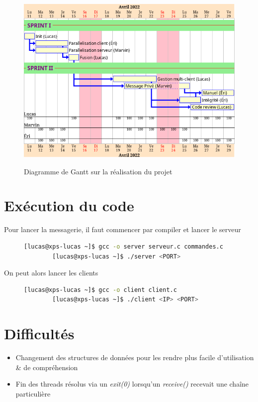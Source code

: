 \documentclass[a4paper,12pt]{article}
\begin{document}
\begin{figure}[h]
	\centering
	\hrulefill\\
	\vspace{0.4cm}
	\includegraphics[width=\linewidth]{gantt.png}\\
	\caption{Diagramme de Gantt sur la réalisation du projet}
	\label{fig:gantt}
	\hrulefill
\end{figure}
\pagebreak
\section{Exécution du code}
Pour lancer la messagerie, il faut commencer par compiler et lancer le serveur
\begin{figure}[h]
	\centering
	\vspace{-0.1cm}
	\begin{lstlisting}[language=bash, gobble=4]
		[lucas@xps-lucas ~]$ gcc -o server serveur.c commandes.c
		[lucas@xps-lucas ~]$ ./server <PORT>
	\end{lstlisting}
\end{figure}

\noindent On peut alors lancer les clients
\begin{figure}[h]
	\centering
	\vspace{-0.2cm}
	\begin{lstlisting}[language=bash, gobble=4]
		[lucas@xps-lucas ~]$ gcc -o client client.c
		[lucas@xps-lucas ~]$ ./client <IP> <PORT>
	\end{lstlisting}
\end{figure}
\section{Difficultés}
\begin{itemize}
	\item Changement des structures de données pour les rendre plus facile d'utilisation \& de compréhension
	\item Fin des threads résolus via un \textit{exit(0)} lorsqu'un \textit{receive()} recevait une chaîne particulière
\end{itemize}
\end{document}
